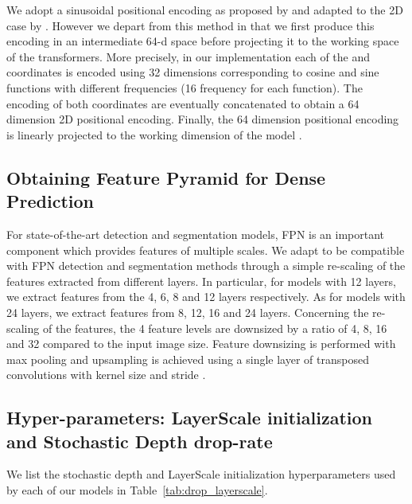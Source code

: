 We adopt a sinusoidal positional encoding as proposed by \citet{vaswani2017attention} and adapted to the 2D case by \citet{carion2020end}. However we depart from this method in that we first produce this encoding in an intermediate 64-d space before projecting it to the working space of the transformers. More precisely, in our implementation each of the  and  coordinates is encoded using 32 dimensions corresponding to cosine and sine functions with different frequencies (16 frequency for each function). The encoding of both coordinates are eventually concatenated to obtain a 64 dimension 2D positional encoding. Finally, the 64 dimension positional encoding is linearly projected to the working dimension of the model .

\subsection{Obtaining Feature Pyramid for Dense Prediction}
\label{sec:fpn_api}

For state-of-the-art detection and segmentation models, FPN is an important component which provides features of multiple scales. We adapt \ours to be compatible with FPN detection and segmentation methods through a simple re-scaling of the features extracted from different layers. In particular, for models with 12 layers, we extract features from the 4, 6, 8 and 12 layers respectively. As for models with 24 layers, we extract features from 8, 12, 16 and 24 layers. Concerning the re-scaling of the features, the 4 feature levels are downsized by a ratio of 4, 8, 16 and 32 compared to the input image size. Feature downsizing is performed with max pooling and upsampling is achieved using a single layer of transposed convolutions with kernel size  and stride .  

\subsection{Hyper-parameters: LayerScale initialization and Stochastic Depth drop-rate} 
\label{sec:ls_sd_values}

We list the stochastic depth  and LayerScale initialization  hyperparameters used by each of our models in Table~\ref{tab:drop_layerscale}.

